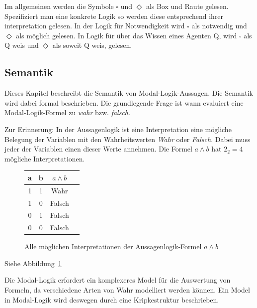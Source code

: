 Im allgemeinen werden die Symbole $\square$ und $\Diamond$ als Box und Raute gelesen. 
Spezifiziert man eine konkrete Logik so werden diese entsprechend ihrer interpretation gelesen. In der Logik für Notwendigkeit wird $\square$ als notwendig und $\Diamond$ als möglich gelesen. In Logik für über das Wissen eines Agenten Q, wird $\square$ als Q weis und $\Diamond$ als soweit Q weis, gelesen.



\subsection{Semantik} %
\label{sec:semantik}

Dieses Kapitel beschreibt die Semantik von Modal-Logik-Aussagen. 
Die Semantik wird dabei formal beschrieben. Die grundlegende Frage ist wann evaluiert eine Modal-Logik-Formel zu \emph{wahr} bzw. \emph{falsch}.

Zur Erinnerung: In der Aussagenlogik ist eine Interpretation eine mögliche Belegung der Variablen mit den Wahrheitswerten \emph{Wahr} oder \emph{Falsch}. Dabei muss jeder der Variablen einen dieser Werte annehmen. Die Formel $a \wedge b$ hat $2_2 = 4$ mögliche Interpretationen. 
\begin{figure}[ht]
	\begin{center}
		\begin{tabular}{cccc}
		\hline
		a & b & $a \wedge b$\\
		\hline
		1 & 1 & Wahr\\
		\hline
		1 & 0 & Falsch\\
		\hline
		0 & 1 & Falsch\\
		\hline
		0 & 0 & Falsch\\
		\hline
		\end{tabular}
		\caption{Alle möglichen Interpretationen der Aussagenlogik-Formel $a \wedge b$}
		\label{tab:AussagenlogikInterpretation}
	\end{center}
\end{figure}
Siehe Abbildung~\ref{tab:AussagenlogikInterpretation}
\cite{hunter1973metalogic}%

Die Modal-Logik erfordert ein komplexeres Model für die Auswertung von Formeln, da verschiedene Arten von Wahr modelliert werden können.\cite[S.308f]{huth2004logic}
Ein Model in Modal-Logik wird deswegen durch eine Kripkestruktur beschrieben. 

